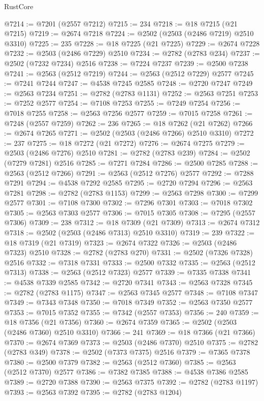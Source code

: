 \begin{lexlean}{RustCore}
\begin{coremodule}
@7214 := @7201 (@2557 @7212)
@7215 := 234
@7218 := @18 @7215 (@21 @7215)
@7219 := @2674 @7218
@7224 := @2502 (@2503 (@2486 @7219) @2510 @3310)
@7225 := 235
@7228 := @18 @7225 (@21 @7225)
@7229 := @2674 @7228
@7232 := @2503 (@2486 @7229) @2510
@7234 := @2782 (@2783 @234)
@7237 := @2502 (@7232 @7234) @2516
@7238 := @7224 @7237
@7239 := @2500 @7238
@7241 := @2563 (@2512 @7219)
@7244 := @2563 (@2512 @7229) @2577
@7245 := @7241 @7244
@7247 := @4538 @7245 @2585
@7248 := @2720 @7247
@7249 := @2563 @7234
@7251 := @2782 (@2783 @1131)
@7252 := @2563 @7251
@7253 := @7252 @2577
@7254 := @7108 @7253
@7255 := @7249 @7254
@7256 := @7018 @7255
@7258 := @2563 @7256 @2577
@7259 := @7015 @7258
@7261 := @7248 (@2557 @7259)
@7262 := 236
@7265 := @18 @7262 (@21 @7262)
@7266 := @2674 @7265
@7271 := @2502 (@2503 (@2486 @7266) @2510 @3310)
@7272 := 237
@7275 := @18 @7272 (@21 @7272)
@7276 := @2674 @7275
@7279 := @2503 (@2486 @7276) @2510
@7281 := @2782 (@2783 @239)
@7284 := @2502 (@7279 @7281) @2516
@7285 := @7271 @7284
@7286 := @2500 @7285
@7288 := @2563 (@2512 @7266)
@7291 := @2563 (@2512 @7276) @2577
@7292 := @7288 @7291
@7294 := @4538 @7292 @2585
@7295 := @2720 @7294
@7296 := @2563 @7281
@7298 := @2782 (@2783 @1153)
@7299 := @2563 @7298
@7300 := @7299 @2577
@7301 := @7108 @7300
@7302 := @7296 @7301
@7303 := @7018 @7302
@7305 := @2563 @7303 @2577
@7306 := @7015 @7305
@7308 := @7295 (@2557 @7306)
@7309 := 238
@7312 := @18 @7309 (@21 @7309)
@7313 := @2674 @7312
@7318 := @2502 (@2503 (@2486 @7313) @2510 @3310)
@7319 := 239
@7322 := @18 @7319 (@21 @7319)
@7323 := @2674 @7322
@7326 := @2503 (@2486 @7323) @2510
@7328 := @2782 (@2783 @270)
@7331 := @2502 (@7326 @7328) @2516
@7332 := @7318 @7331
@7333 := @2500 @7332
@7335 := @2563 (@2512 @7313)
@7338 := @2563 (@2512 @7323) @2577
@7339 := @7335 @7338
@7341 := @4538 @7339 @2585
@7342 := @2720 @7341
@7343 := @2563 @7328
@7345 := @2782 (@2783 @1175)
@7347 := @2563 @7345 @2577
@7348 := @7108 @7347
@7349 := @7343 @7348
@7350 := @7018 @7349
@7352 := @2563 @7350 @2577
@7353 := @7015 @7352
@7355 := @7342 (@2557 @7353)
@7356 := 240
@7359 := @18 @7356 (@21 @7356)
@7360 := @2674 @7359
@7365 := @2502 (@2503 (@2486 @7360) @2510 @3310)
@7366 := 241
@7369 := @18 @7366 (@21 @7366)
@7370 := @2674 @7369
@7373 := @2503 (@2486 @7370) @2510
@7375 := @2782 (@2783 @349)
@7378 := @2502 (@7373 @7375) @2516
@7379 := @7365 @7378
@7380 := @2500 @7379
@7382 := @2563 (@2512 @7360)
@7385 := @2563 (@2512 @7370) @2577
@7386 := @7382 @7385
@7388 := @4538 @7386 @2585
@7389 := @2720 @7388
@7390 := @2563 @7375
@7392 := @2782 (@2783 @1197)
@7393 := @2563 @7392
@7395 := @2782 (@2783 @1204)

\end{coremodule}
\end{lexlean}
